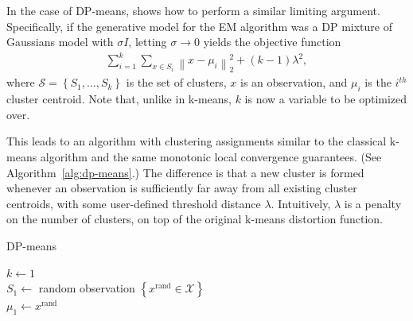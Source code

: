 \documentclass[letterpaper,10 pt,conference]{ieeeconf}
\begin{document}
In the case of DP-means, \cite{KJ:12} shows how to perform a similar limiting argument. Specifically, if the generative model for the EM algorithm was a DP mixture of Gaussians model with $\sigma I$, letting $\sigma \rightarrow 0$ yields the objective function
\begin{align}
  \sum_{i = 1}^{k}\sum_{x \in S_{i}} \left\| x - \mu_{i} \right\|_{2}^{2} + \left(k - 1\right)\lambda^{2},
  \label{eqn:dp-means}
\end{align}
where $\mathcal{S} = \left\{ S_{1},\ldots,S_{k} \right\}$ is the set of clusters, $x$ is an observation, and $\mu_{i}$ is the $i^{th}$ cluster centroid. Note that, unlike in k-means, $k$ is now a variable to be optimized over.

This leads to an algorithm with clustering assignments similar to the classical k-means algorithm and the same monotonic local convergence guarantees. (See Algorithm~\ref{alg:dp-means}.) The difference is that a new cluster is formed whenever an observation is sufficiently far away from all existing cluster centroids, with some user-defined threshold distance $\lambda$. Intuitively, $\lambda$ is a penalty on the number of clusters, on top of the original k-means distortion function. 

\begin{algorithm}[!htbp]
  \caption{DP-means}

  \DontPrintSemicolon

  
  
  \smallskip

  $k \leftarrow 1$ \\
  $S_{1} \leftarrow$ random observation $\left\{x^{\text{rand}}\in\mathcal{X}\right\}$ \\
  $\mu_{1} \leftarrow x^{\text{rand}}$


  \label{alg:dp-means}
\end{algorithm}
\end{document}
